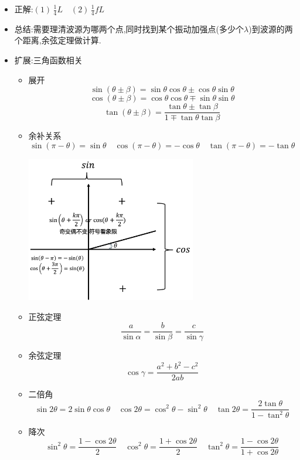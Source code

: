 \documentclass{article}
\begin{document}
\begin{itemize}
    \item 正解:\quad $(1)\,\frac{1}{4}L \quad (2)\,\frac{1}{4}fL$
    \item 总结:\quad 需要理清波源为哪两个点,同时找到某个振动加强点(多少个$\lambda$)到波源的两个距离,余弦定理做计算.
    \item 扩展:\quad 三角函数相关
          \begin{formal}
              \begin{itemize}
                  \item 展开
                        $$ \sin{(\theta \pm \beta)} = \sin{\theta}\cos{\theta} \pm \cos{\theta}\sin{\theta} $$
                        $$ \cos{(\theta \pm \beta)} = \cos{\theta}\cos{\theta} \mp \sin{\theta}\sin{\theta} $$
                        $$ \tan{(\theta \pm \beta)} = \dfrac{\tan{\theta} \pm \tan{\beta}}{1 \mp \tan{\theta}\tan{\beta}}$$

                  \item 余补关系
                        $$ \sin{(\pi - \theta)} = \sin{\theta} \quad \cos{(\pi - \theta)} = - \cos{\theta} \quad \tan{(\pi - \theta)} = -\tan{\theta}$$

                        \includegraphics[width = 20em]{./pictures/2.1-5.png}

                  \item 正弦定理
                        $$ \dfrac{a}{\sin{\alpha}} = \dfrac{b}{\sin{\beta}} = \dfrac{c}{\sin{\gamma}}   $$

                  \item 余弦定理
                        $$ \cos{\gamma} = \dfrac{a^{2}+b^{2} - c^{2}}{2ab} $$

                  \item 二倍角
                        $$ \sin{2\theta} = 2\sin{\theta}\cos{\theta} \quad \cos{2\theta} = \cos^{2}{\theta} - \sin^{2}{\theta} \quad \tan{2\theta} = \dfrac{2\tan{\theta}}{1-\tan^{2}{\theta}}$$

                  \item 降次
                        $$ \sin^{2}{\theta} = \dfrac{1 - \cos{2\theta}}{2} \quad \cos^{2}{\theta} = \dfrac{1 + \cos{2\theta}}{2} \quad \tan^{2}{\theta} = \dfrac{1-\cos{2\theta}}{1+\cos{2\theta}}$$
              \end{itemize}
          \end{formal}
\end{itemize}
\end{document}
